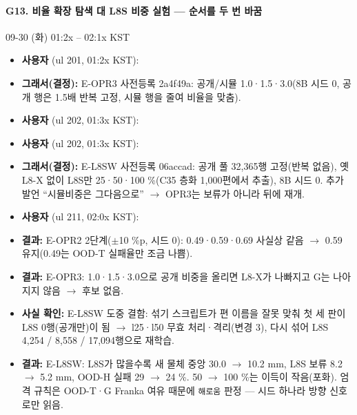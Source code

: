 \paragraph{G13. 비율 확장 탐색 대 L8S 비중 실험 --- 순서를 두 번 바꿈}
{\small 09-30 (화) 01:2x -- 02:1x KST}
\begin{itemize}
  \item \textbf{사용자} (ul 201, 01:2x KST): 
  \item \textbf{그래서(결정):} E-OPR3 사전등록 2a4f49a: 공개/시뮬 1.0·1.5·3.0(8B 시드 0, 공개 행은 1.5배 반복 고정, 시뮬 행을 줄여 비율을 맞춤).
  \item \textbf{사용자} (ul 202, 01:3x KST): 
  \item \textbf{사용자} (ul 202, 01:3x KST): 
  \item \textbf{그래서(결정):} E-L8SW 사전등록 06accad: 공개 풀 32,365행 고정(반복 없음), 옛 L8-X 없이 L8S만 25·50·100 \%(C35 층화 1,000편에서 추출), 8B 시드 0. 추가 발언 ``시뮬비중은 그다음으로'' $\rightarrow$ OPR3는 보류가 아니라 뒤에 재개.
  \item \textbf{사용자} (ul 211, 02:0x KST): 
  \item \textbf{결과:} E-OPR2 2단계($\pm$10 \%p, 시드 0): 0.49·0.59·0.69 사실상 같음 $\rightarrow$ 0.59 유지(0.49는 OOD-T 실패율만 조금 나쁨).
  \item \textbf{결과:} E-OPR3: 1.0·1.5·3.0으로 공개 비중을 올리면 L8-X가 나빠지고 G는 나아지지 않음 $\rightarrow$ 후보 없음.
  \item \textbf{사실 확인:} E-L8SW 도중 결함: 섞기 스크립트가 편 이름을 잘못 맞춰 첫 세 판이 L8S 0행(공개만)이 됨 $\rightarrow$ l25·l50 무효 처리·격리(변경 3), 다시 섞어 L8S 4,254 / 8,558 / 17,094행으로 재학습.
  \item \textbf{결과:} E-L8SW: L8S가 많을수록 새 물체 중앙 30.0 $\rightarrow$ 10.2 mm, L8S 보류 8.2 $\rightarrow$ 5.2 mm, OOD-H 실패 29 $\rightarrow$ 24 \%. 50 $\rightarrow$ 100 \%는 이득이 작음(포화). 엄격 규칙은 OOD-T·G Franka 여유 때문에 \texttt{해로움} 판정 --- 시드 하나라 방향 신호로만 읽음.
\end{itemize}

